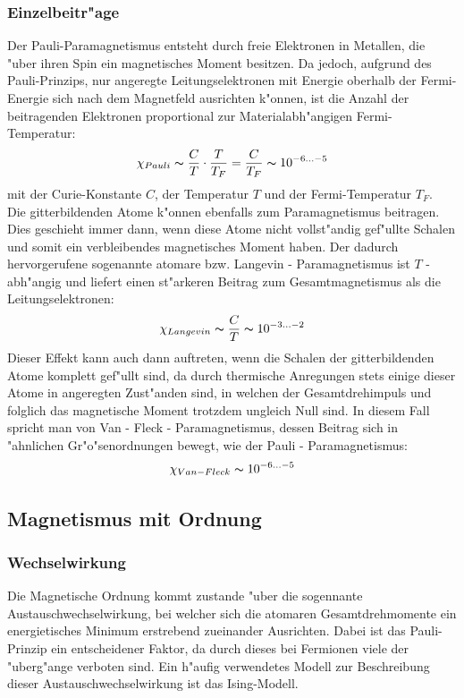             \subsubsection*{Einzelbeitr"age}
            Der Pauli-Paramagnetismus entsteht durch freie Elektronen in Metallen, die "uber ihren Spin
            ein magnetisches Moment besitzen. Da jedoch, aufgrund des Pauli-Prinzips, nur angeregte
            Leitungselektronen mit Energie oberhalb der Fermi-Energie sich nach dem Magnetfeld ausrichten k"onnen,
            ist die Anzahl der beitragenden Elektronen proportional zur Materialabh"angigen Fermi-Temperatur:
            \begin{equation}
                \chi_{Pauli} \thicksim \frac{C}{T} \cdot \frac{T}{T_{F}} = \frac{C}{T_F}\thicksim 10^{-6 ... -5}
            \end{equation}
            mit der Curie-Konstante $C$, der Temperatur $T$ und der Fermi-Temperatur $T_F$.
            \\
            Die gitterbildenden Atome k"onnen ebenfalls zum Paramagnetismus beitragen. Dies geschieht immer dann, wenn diese Atome nicht vollst"andig gef"ullte Schalen und somit ein verbleibendes magnetisches Moment haben. Der dadurch hervorgerufene sogenannte atomare bzw. Langevin - Paramagnetismus ist $T$ - abh"angig und liefert einen st"arkeren Beitrag zum Gesamtmagnetismus als die Leitungselektronen:
            \begin{equation}
            	\chi_{Langevin} \thicksim \frac{C}{T} \thicksim 10^{-3 ... -2}
            \end{equation}
			Dieser Effekt kann auch dann auftreten, wenn die Schalen der gitterbildenden Atome komplett gef"ullt sind, da durch thermische Anregungen stets einige dieser Atome in angeregten Zust"anden sind, in welchen der Gesamtdrehimpuls und folglich das magnetische Moment trotzdem ungleich Null sind. In diesem Fall spricht man von Van - Fleck - Paramagnetismus, dessen Beitrag sich in "ahnlichen Gr"o"senordnungen bewegt, wie der Pauli - Paramagnetismus:
			\begin{equation}
				\chi_{Van - Fleck} \thicksim 10^{-6 ... -5}
			\end{equation}
			


    \subsection{Magnetismus mit Ordnung}
        \subsubsection*{Wechselwirkung}
            Die Magnetische Ordnung kommt zustande "uber die sogennante Austauschwechselwirkung, bei welcher sich
            die atomaren Gesamtdrehmomente ein energietisches Minimum erstrebend zueinander Ausrichten. Dabei ist
            das Pauli-Prinzip ein entscheidener Faktor, da durch dieses bei Fermionen viele der "uberg"ange verboten sind.
            Ein h"aufig verwendetes Modell zur Beschreibung dieser Austauschwechselwirkung ist das Ising-Modell.
